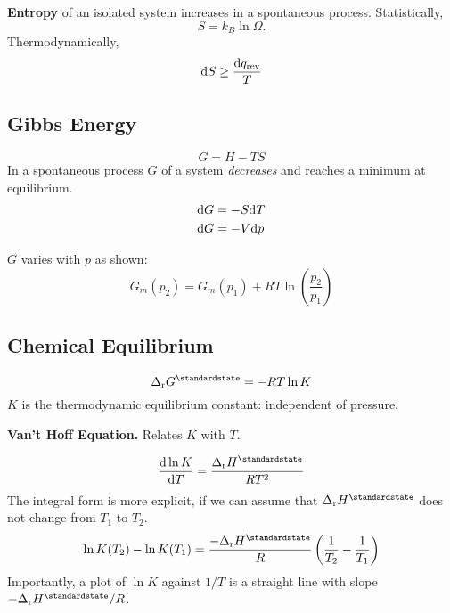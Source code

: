 \textbf{Entropy} of an isolated system increases in a spontaneous process. Statistically,
\begin{equation*}
    S = k_B \ln \Omega.
\end{equation*}
Thermodynamically,
\begin{equation*}
    \differential S \geq \frac{\differential q_{\textrm{rev}}}{T}
\end{equation*}

\subsection*{Gibbs Energy}
\begin{equation*}
    G = H - TS
\end{equation*}
In a spontaneous process $G$ of a system \textit{decreases} and reaches a minimum at equilibrium.
\begin{equation*}
    \begin{aligned}
        \differential G &= -S \differential T \\
        \differential G &= -V \differential p
    \end{aligned}
\end{equation*}

$G$ varies with $p$ as shown:
\begin{equation*}
    G_m(p_2) = G_m(p_1) + RT \ln \left(\frac{p_2}{p_1}\right)
\end{equation*}

\columnbreak
\subsection*{Chemical Equilibrium}
\begin{equation*}
    \Delta_{\mathrm{r}}G^\standardstate = -RT \ln K
\end{equation*}
$K$ is the thermodynamic equilibrium constant: independent of pressure.

\textbf{Van't Hoff Equation.} Relates $K$ with $T$.

\begin{equation*}
    \dv{\ln K}{T} = \frac{\Delta_{\mathrm{r}}H^\standardstate}{RT^2}
\end{equation*}
The integral form is more explicit, if we can assume that $\Delta_{\mathrm{r}}H^\standardstate$ does not change from $T_1$ to $T_2$.
\begin{equation*}
    \ln K (T_2) - \ln K (T_1) = \frac{-\Delta_{\mathrm{r}}H^\standardstate}{R} \left(\frac{1}{T_2} - \frac{1}{T_1}\right)
\end{equation*}
Importantly, a plot of $\ln K$ against $1/T$ is a straight line with slope $-\Delta_{\mathrm{r}}H^\standardstate / R$.

